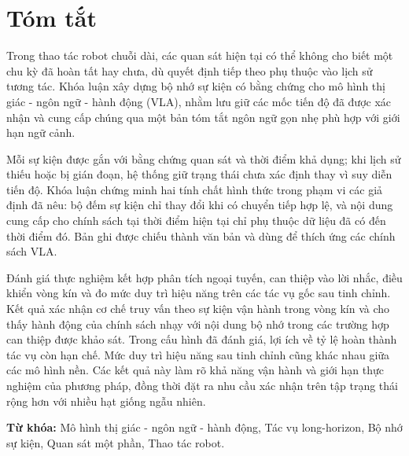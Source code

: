 \chapter*{Tóm tắt}
\thispagestyle{empty}

Trong thao tác robot chuỗi dài, các quan sát hiện tại có thể không cho biết một chu kỳ đã hoàn tất hay chưa, dù quyết định tiếp theo phụ thuộc vào lịch sử tương tác. Khóa luận xây dựng bộ nhớ sự kiện có bằng chứng cho mô hình thị giác - ngôn ngữ - hành động (VLA), nhằm lưu giữ các mốc tiến độ đã được xác nhận và cung cấp chúng qua một bản tóm tắt ngôn ngữ gọn nhẹ phù hợp với giới hạn ngữ cảnh.

Mỗi sự kiện được gắn với bằng chứng quan sát và thời điểm khả dụng; khi lịch sử thiếu hoặc bị gián đoạn, hệ thống giữ trạng thái chưa xác định thay vì suy diễn tiến độ. Khóa luận chứng minh hai tính chất hình thức trong phạm vi các giả định đã nêu: bộ đếm sự kiện chỉ thay đổi khi có chuyển tiếp hợp lệ, và nội dung cung cấp cho chính sách tại thời điểm hiện tại chỉ phụ thuộc dữ liệu đã có đến thời điểm đó. Bản ghi được chiếu thành văn bản và dùng để thích ứng các chính sách VLA.

Đánh giá thực nghiệm kết hợp phân tích ngoại tuyến, can thiệp vào lời nhắc, điều khiển vòng kín và đo mức duy trì hiệu năng trên các tác vụ gốc sau tinh chỉnh. Kết quả xác nhận cơ chế truy vấn theo sự kiện vận hành trong vòng kín và cho thấy hành động của chính sách nhạy với nội dung bộ nhớ trong các trường hợp can thiệp được khảo sát. Trong cấu hình đã đánh giá, lợi ích về tỷ lệ hoàn thành tác vụ còn hạn chế. Mức duy trì hiệu năng sau tinh chỉnh cũng khác nhau giữa các mô hình nền. Các kết quả này làm rõ khả năng vận hành và giới hạn thực nghiệm của phương pháp, đồng thời đặt ra nhu cầu xác nhận trên tập trạng thái rộng hơn với nhiều hạt giống ngẫu nhiên.

\textbf{Từ khóa:} Mô hình thị giác - ngôn ngữ - hành động, Tác vụ long-horizon, Bộ nhớ sự kiện, Quan sát một phần, Thao tác robot.

